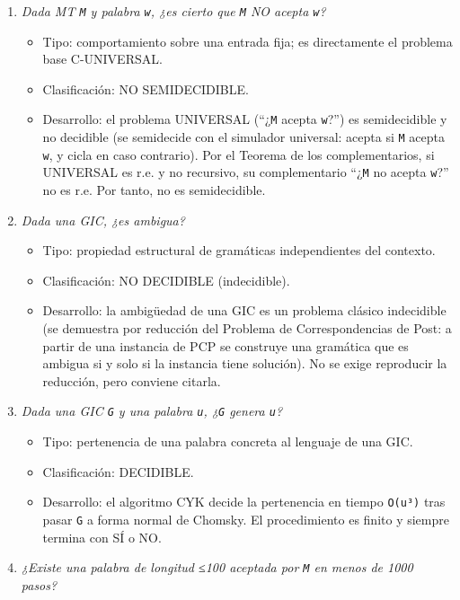 \documentclass[12pt]{book} %
\providecommand{\tightlist}{%
  \setlength{\itemsep}{0pt}\setlength{\parskip}{0pt}}
\begin{document}
\begin{enumerate}
\def\labelenumi{\arabic{enumi}.}
\tightlist
\item
  \emph{Dada MT \texttt{M} y palabra \texttt{w}, ¿es cierto que
  \texttt{M} NO acepta \texttt{w}?}

  \begin{itemize}
  \tightlist
  \item
    Tipo: comportamiento sobre una entrada fija; es directamente el
    problema base C-UNIVERSAL.
  \item
    Clasificación: NO SEMIDECIDIBLE.
  \item
    Desarrollo: el problema UNIVERSAL (``¿\texttt{M} acepta
    \texttt{w}?'') es semidecidible y no decidible (se semidecide con el
    simulador universal: acepta si \texttt{M} acepta \texttt{w}, y cicla
    en caso contrario). Por el Teorema de los complementarios, si
    UNIVERSAL es r.e. y no recursivo, su complementario ``¿\texttt{M} no
    acepta \texttt{w}?'' no es r.e. Por tanto, no es semidecidible.
  \end{itemize}
\item
  \emph{Dada una GIC, ¿es ambigua?}

  \begin{itemize}
  \tightlist
  \item
    Tipo: propiedad estructural de gramáticas independientes del
    contexto.
  \item
    Clasificación: NO DECIDIBLE (indecidible).
  \item
    Desarrollo: la ambigüedad de una GIC es un problema clásico
    indecidible (se demuestra por reducción del Problema de
    Correspondencias de Post: a partir de una instancia de PCP se
    construye una gramática que es ambigua si y solo si la instancia
    tiene solución). No se exige reproducir la reducción, pero conviene
    citarla.
  \end{itemize}
\item
  \emph{Dada una GIC \texttt{G} y una palabra \texttt{u}, ¿\texttt{G}
  genera \texttt{u}?}

  \begin{itemize}
  \tightlist
  \item
    Tipo: pertenencia de una palabra concreta al lenguaje de una GIC.
  \item
    Clasificación: DECIDIBLE.
  \item
    Desarrollo: el algoritmo CYK decide la pertenencia en tiempo
    \texttt{O(\textbar{}u\textbar{}³)} tras pasar \texttt{G} a forma
    normal de Chomsky. El procedimiento es finito y siempre termina con
    SÍ o NO.
  \end{itemize}
\item
  \emph{¿Existe una palabra de longitud ≤100 aceptada por \texttt{M} en
  menos de 1000 pasos?}


\end{enumerate}
\end{document}
